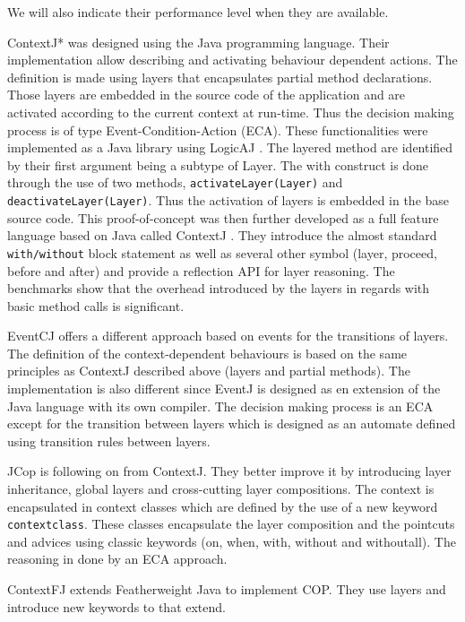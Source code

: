 \documentclass[a4paper]{article}
\begin{document}
We will also indicate their performance level when they are available.

ContextJ* \cite{appeltauer_dedicated_2008} was designed using the Java programming language. Their implementation allow describing and activating behaviour dependent actions. The definition is made using layers that encapsulates partial method declarations. Those layers are embedded in the source code of the application and are activated according to the current context at run-time. Thus the decision making process is of type Event-Condition-Action (ECA). These functionalities were implemented as a Java library using LogicAJ \cite{}. The layered method are identified by their first argument being a subtype of Layer. The  with construct is done through the use of two methods, \lstinline|activateLayer(Layer)| and \lstinline|deactivateLayer(Layer)|. Thus the activation of layers is embedded in the base source code. This proof-of-concept was then further developed as a full feature language based on Java called ContextJ \cite{haupt_contextj:_2011} \cite{appeltauer_improving_2009}. They introduce  the almost standard \lstinline|with/without| block statement as well as several other symbol (layer, proceed, before and after) and provide a reflection API for layer reasoning. The benchmarks show that the overhead introduced by the layers in regards with basic method calls is significant.

EventCJ \cite{kamina_eventcj:_2011} offers a different approach based on events for the transitions of layers. The definition of the context-dependent behaviours is based on the same principles as ContextJ described above (layers and partial methods). The implementation is also different since EventJ is designed as en extension of the Java language with its own compiler. The decision making process is an ECA except for the transition between layers which is designed as an automate defined using transition rules between layers.


JCop \cite{appeltauer_declarative_2013} is following on from ContextJ. They better improve it by introducing layer inheritance, global layers and cross-cutting layer compositions. The context is encapsulated in context classes which are defined by the use of a new keyword \lstinline|contextclass|. These classes encapsulate the layer composition and the pointcuts and advices using classic keywords (on, when, with, without and withoutall). The reasoning in done by an ECA approach.

ContextFJ \cite{clarke_semantics_2009} extends Featherweight Java \cite{} to implement COP. They use layers and introduce new keywords to that extend.
\end{document}
